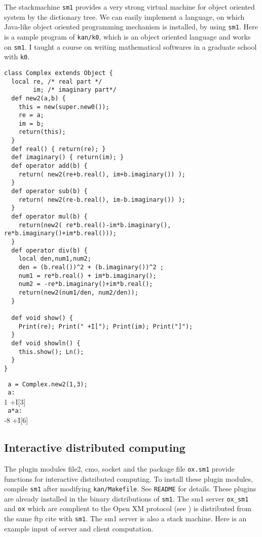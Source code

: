The stackmachine {\tt sm1} provides a very strong virtual machine for
object oriented system by the dictionary tree.
We can easily implement a language, on which Java-like object 
oriented programming mechanism is installed,
by using {\tt sm1}.
Here is a sample program of {\tt kan/k0}, which is an object oriented
language and works on {\tt sm1}.
I taught a course on writing mathematical softwares
in a graduate school with {\tt k0}.
\begin{verbatim}
class Complex extends Object {
  local re, /* real part */
        im; /* imaginary part*/
  def new2(a,b) {
    this = new(super.new0());
    re = a;
    im = b;
    return(this);
  }
  def real() { return(re); }
  def imaginary() { return(im); }
  def operator add(b) {
    return( new2(re+b.real(), im+b.imaginary()) );
  }
  def operator sub(b) {
    return( new2(re-b.real(), im-b.imaginary()) );
  }
  def operator mul(b) {
    return(new2( re*b.real()-im*b.imaginary(), re*b.imaginary()+im*b.real()));
  }
  def operator div(b) {
    local den,num1,num2;
    den = (b.real())^2 + (b.imaginary())^2 ;
    num1 = re*b.real() + im*b.imaginary();
    num2 = -re*b.imaginary()+im*b.real();
    return(new2(num1/den, num2/den));
  }

  def void show() {
    Print(re); Print(" +I["); Print(im); Print("]");
  }
  def void showln() {
    this.show(); Ln();
  }
}

\end{verbatim}
\verb! a = Complex.new2(1,3); ! \\
\verb! a: ! \\
1 +I[3]  \\
\verb! a*a: ! \\
-8 +I[6]  \\



\subsection{Interactive distributed computing}

The plugin modules file2, cmo, socket and the package file
{\tt ox.sm1} provide functions for 
interactive distributed computing.
To install these plugin modules, compile {\tt sm1} after modifying 
{\tt kan/Makefile}.
See {\tt README} for details.
These plugins are already installed in the binary distributions of {\tt sm1}.
The sm1 server {\tt ox\_sm1} and {\tt ox} which are complient to the Open XM
protocol
(see \cite{openxxx})
is distributed from the same ftp cite with {\tt sm1}.
The sm1 server is also a stack machine.
Here is an example input of server and client computation.

